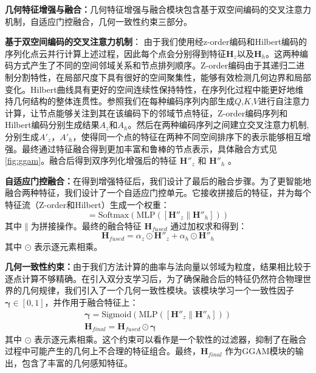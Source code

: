 \documentclass[preprint,12pt]{elsarticle}
\begin{document}
\textbf{几何特征增强与融合：}几何特征增强与融合模块包含基于双空间编码的交叉注意力机制，自适应门控融合，几何一致性约束三部分。

\textbf{基于双空间编码的交叉注意力机制}：
由于我们使用经z-order编码和Hilbert编码的序列化点云并行计算上述过程，因此每个点会分别得到特征$\mathbf{H}_{z}$以及$\mathbf{H}_{h}$。这两种编码方式产生了不同的空间邻域关系和节点排列顺序。Z-order编码由于其递归二进制分割特性，在局部尺度下具有很好的空间聚集性，能够有效检测几何边界和局部变化。Hilbert曲线具有更好的空间连续性保持特性，在序列化过程中能更好地维持几何结构的整体连贯性。参照\cite{attention}我们在每种编码序列内部生成$Q$,$K$,$V$进行自注意力计算，让节点能够关注到其在该编码下的邻域节点特征，Z-order编码序列和Hilbert编码分别生成结果$A_z$和$A_h$。然后在两种编码序列之间建立交叉注意力机制,分别生成${A}'_z$，${A}'_h$，使得同一个点的特征在两种不同空间排序下的表示能够相互增强。最终通过特征融合得到更加丰富和鲁棒的节点表示，具体融合方式见\cref{fig:ggam}。融合后得到双序列化增强后的特征 $\mathbf{H}''_z$ 和 $\mathbf{H}''_h$ 。


\textbf{自适应门控融合：}在得到增强特征后，我们设计了最后的融合步骤。为了更智能地融合两种特征，我们设计了一个自适应门控单元。它接收拼接后的特征，并为每个特征流（Z-order和Hilbert）生成一个权重：
\begin{equation}
	[\alpha_z, \alpha_h] = \text{Softmax}(\text{MLP}([\mathbf{H}''_z \| \mathbf{H}''_h]))
	\label{eq:adaptive_gate}
\end{equation}
其中$\|$为拼接操作。最终的融合特征 $\mathbf{H}_{fused}$ 通过加权求和得到：
\begin{equation}
	\mathbf{H}_{fused} = \alpha_z \odot \mathbf{H}''_z + \alpha_h \odot \mathbf{H}''_h
	\label{eq:gated_fusion}
\end{equation}
其中 $\odot$ 表示逐元素相乘。


\textbf{几何一致性约束：}由于我们方法计算的曲率与法向量以邻域为粒度，结果相比较于逐点计算不够精确。在引入双分支学习后，为了确保融合后的特征仍然符合物理世界的几何规律，我们引入了一个几何一致性模块。该模块学习一个一致性因子 $\boldsymbol{\gamma} \in [0, 1]$，并作用于融合特征上：
\begin{gather}
	\boldsymbol{\gamma} = \text{Sigmoid}(\text{MLP}([\mathbf{H}''_z \| \mathbf{H}''_h])) \label{eq:consistency_factor} \\
	\mathbf{H}_{final} = \mathbf{H}_{fused} \odot \boldsymbol{\gamma} \label{eq:final_feature}
\end{gather}
其中 $\odot$ 表示逐元素相乘。这个约束可以看作是一个软性的过滤器，抑制了在融合过程中可能产生的几何上不合理的特征组合。最终，$\mathbf{H}_{final}$ 作为GGAM模块的输出，包含了丰富的几何感知特征。
\end{document}
